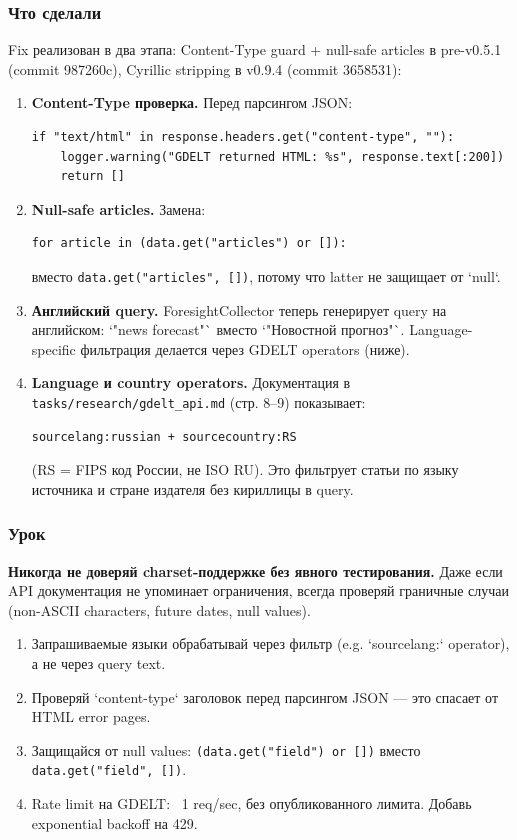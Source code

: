\subsubsection*{Что сделали}
Fix реализован в два этапа: Content-Type guard + null-safe articles в pre-v0.5.1 (commit 987260c), Cyrillic stripping в v0.9.4 (commit 3658531):

\begin{enumerate}
\item \textbf{Content-Type проверка.} Перед парсингом JSON:
\begin{verbatim}
if "text/html" in response.headers.get("content-type", ""):
    logger.warning("GDELT returned HTML: %s", response.text[:200])
    return []
\end{verbatim}

\item \textbf{Null-safe articles.} Замена:
\begin{verbatim}
for article in (data.get("articles") or []):
\end{verbatim}
вместо \texttt{data.get("articles", [])}, потому что latter не защищает от `null`.

\item \textbf{Английский query.} ForesightCollector теперь генерирует query на английском: `"news forecast"` вместо `"Новостной прогноз"`. Language-specific фильтрация делается через GDELT operators (ниже).

\item \textbf{Language и country operators.} Документация в \texttt{tasks/research/gdelt\_api.md} (стр. 8--9) показывает:
\begin{verbatim}
sourcelang:russian + sourcecountry:RS
\end{verbatim}
(RS = FIPS код России, не ISO RU). Это фильтрует статьи по языку источника и стране издателя без кириллицы в query.
\end{enumerate}

\subsubsection*{Урок}
\textbf{Никогда не доверяй charset-поддержке без явного тестирования.} Даже если API документация не упоминает ограничения, всегда проверяй граничные случаи (non-ASCII characters, future dates, null values).

\begin{enumerate}
\item Запрашиваемые языки обрабатывай через фильтр (e.g. `sourcelang:` operator), а не через query text.
\item Проверяй `content-type` заголовок перед парсингом JSON --- это спасает от HTML error pages.
\item Защищайся от null values: \texttt{(data.get("field") or [])} вместо \texttt{data.get("field", [])}.
\item Rate limit на GDELT: ~1 req/sec, без опубликованного лимита. Добавь exponential backoff на 429.
\end{enumerate}


